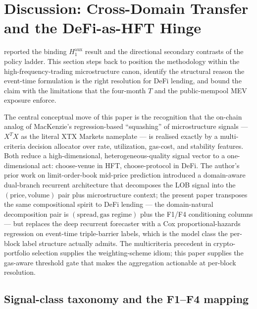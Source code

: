 \section{Discussion: Cross-Domain Transfer and the DeFi-as-HFT Hinge}
\label{sec:discussion}

 reported the binding $H_{1}^{\text{aux}}$
result and the directional secondary contrasts of the policy
ladder.  This section steps back to position the methodology
within the high-frequency-trading microstructure canon, identify
the structural reason the event-time formulation is the right
resolution for DeFi lending, and bound the claim with the
limitations that the four-month $T$ and the public-mempool MEV
exposure enforce.

The central conceptual move of this paper is the recognition that
the on-chain analog of MacKenzie's regression-based ``squashing''
of microstructure signals \cite[p.\,176]{mackenzie2021} ---
$X^{T} X$ as the literal XTX Markets nameplate --- is realised
exactly by a multi-criteria decision allocator over rate,
utilization, gas-cost, and stability features.  Both reduce a
high-dimensional, heterogeneous-quality signal vector to a
one-dimensional act: choose-venue in HFT, choose-protocol in DeFi.
The author's prior work on limit-order-book mid-price prediction
\cite{solovev2026lob} introduced a domain-aware dual-branch
recurrent architecture that decomposes the LOB signal into the
$(\text{price}, \text{volume})$ pair plus microstructure context;
the present paper transposes the same compositional spirit to DeFi
lending --- the domain-natural decomposition pair is
$(\text{spread}, \text{gas regime})$ plus the F1/F4 conditioning
columns --- but replaces the deep recurrent forecaster with a Cox
proportional-hazards regression on event-time triple-barrier
labels, which is the model class the per-block label structure
actually admits.
The multicriteria precedent in crypto-portfolio selection
\cite{aljinovic2021crypto} supplies the weighting-scheme idiom;
this paper supplies the gas-aware threshold gate that makes the
aggregation actionable at per-block resolution.

\subsection{Signal-class taxonomy and the F1--F4 mapping}
\label{sec:disc-signals}

